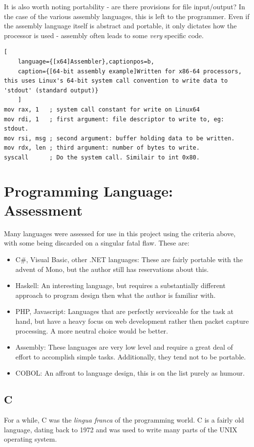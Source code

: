 \documentclass[10pt,a4paper,notitlepage]{report}
\begin{document}
It is also worth noting portability - are there provisions for file input/output? In the case of the various assembly languages, this is left to the programmer. Even if the assembly language itself is abstract and portable, it only dictates how the processor is used - assembly often leads to some \emph{very} specific code.

\begin{lstlisting}[
	language={[x64]Assembler},captionpos=b,
	caption={[64-bit assembly example]Written for x86-64 processors, this uses Linux's 64-bit system call convention to write data to 'stdout' (standard output)}
	]
mov rax, 1   ; system call constant for write on Linux64
mov rdi, 1   ; first argument: file descriptor to write to, eg: stdout.
mov rsi, msg ; second argument: buffer holding data to be written.
mov rdx, len ; third argument: number of bytes to write.
syscall      ; Do the system call. Similair to int 0x80.
\end{lstlisting}

\section{Programming Language: Assessment}
Many languages were assessed for use in this project using the criteria above, with some being discarded on a singular fatal flaw. These are:
\begin{itemize}
\item C\#, Visual Basic, other .NET languages: These are fairly portable with the advent of Mono\cite{mono}, but the author still has reservations about this.
\item Haskell: An interesting language, but requires a substantially different approach to program design then what the author is familiar with.
\item PHP, Javascript: Languages that are perfectly serviceable for the task at hand, but have a heavy focus on web development rather then packet capture processing. A more neutral choice would be better.
\item Assembly: These languages are very low level and require a great deal of effort to accomplish simple tasks. Additionally, they tend not to be portable.
\item COBOL: An affront to language design, this is on the list purely as humour.
\end{itemize}

\subsection{C}
For a while, C was the \emph{lingua franca} of the programming world. C is a fairly old language, dating back to 1972 and was used to write many parts of the UNIX operating system\cite{tcpl}.
\end{document}
